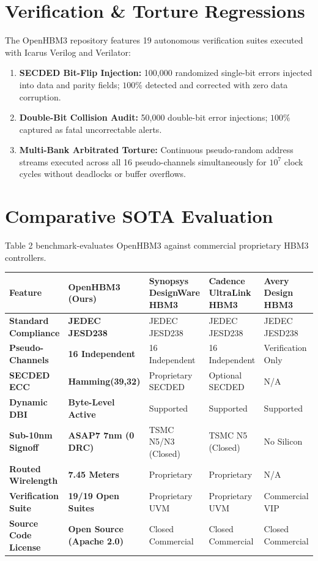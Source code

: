 \documentclass[journal,10pt,twocolumn]{IEEEtran}
\begin{document}
\section{Verification \& Torture Regressions}

The OpenHBM3 repository features 19 autonomous verification suites executed with Icarus Verilog and Verilator:
\begin{enumerate}
  \item \textbf{SECDED Bit-Flip Injection:} 100,000 randomized single-bit errors injected into data and parity fields; $100\%$ detected and corrected with zero data corruption.
  \item \textbf{Double-Bit Collision Audit:} 50,000 double-bit error injections; $100\%$ captured as fatal uncorrectable alerts.
  \item \textbf{Multi-Bank Arbitrated Torture:} Continuous pseudo-random address streams executed across all 16 pseudo-channels simultaneously for $10^7$ clock cycles without deadlocks or buffer overflows.
\end{enumerate}


\section{Comparative SOTA Evaluation}

Table 2 benchmark-evaluates OpenHBM3 against commercial proprietary HBM3 controllers.

\begin{table}[htbp]
\centering\footnotesize
\begin{tabular}{p{} p{} p{} p{} p{}}
\toprule
\textbf{Feature} & \textbf{OpenHBM3 (Ours)} & \textbf{Synopsys DesignWare HBM3} & \textbf{Cadence UltraLink HBM3} & \textbf{Avery Design HBM3} \\
\midrule
\textbf{Standard Compliance} & \textbf{JEDEC JESD238} & JEDEC JESD238 & JEDEC JESD238 & JEDEC JESD238 \\
\textbf{Pseudo-Channels} & \textbf{16 Independent} & 16 Independent & 16 Independent & Verification Only \\
\textbf{SECDED ECC} & \textbf{Hamming(39,32)} & Proprietary SECDED & Optional SECDED & N/A \\
\textbf{Dynamic DBI} & \textbf{Byte-Level Active} & Supported & Supported & Supported \\
\textbf{Sub-10nm Signoff} & \textbf{ASAP7 7nm (0 DRC)} & TSMC N5/N3 (Closed) & TSMC N5 (Closed) & No Silicon \\
\textbf{Routed Wirelength} & \textbf{7.45 Meters} & Proprietary & Proprietary & N/A \\
\textbf{Verification Suite} & \textbf{19/19 Open Suites} & Proprietary UVM & Proprietary UVM & Commercial VIP \\
\textbf{Source Code License} & \textbf{Open Source (Apache 2.0)} & Closed Commercial & Closed Commercial & Closed Commercial \\
\bottomrule
\end{tabular}
\vspace{4pt}
\end{table}
\end{document}
